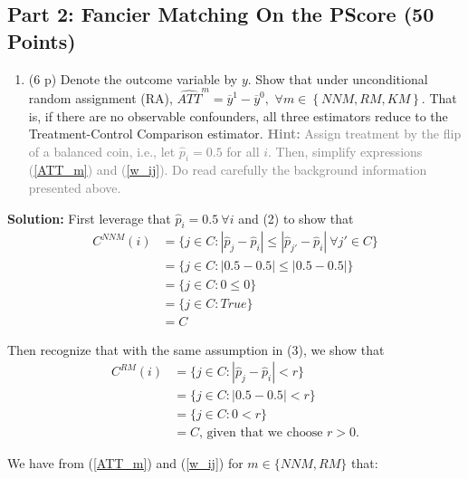 \documentclass[
]{article}
\providecommand{\tightlist}{%
  \setlength{\itemsep}{0pt}\setlength{\parskip}{0pt}}
\begin{document}
\subsection{Part 2: Fancier Matching On the PScore (50
Points)}\label{part-2-fancier-matching-on-the-pscore-50-points}


\newpage

\begin{enumerate}
\def\labelenumi{\arabic{enumi}.}
\setcounter{enumi}{3}
\tightlist
\item
  (6 p) Denote the outcome variable by \(y\). Show that under
  unconditional random assignment (RA),
  \(\widehat{ATT}^{m}=\overline{y}^{1}-\overline{y}^{0},\)
  \(\forall m\in \left\{ NNM,RM,KM\right\}\). That is, if there are no
  observable confounders, all three estimators reduce to the
  Treatment-Control Comparison estimator.
  \textcolor{gray}{\textbf{Hint:} Assign treatment by the flip of a balanced coin, i.e., let $\widehat{p}_{i}=0.5$ for all $i$. Then, simplify expressions (\ref{ATT_m}) and (\ref{w_ij}). Do read carefully the background information presented above.}
\end{enumerate}

\textbf{Solution:} First leverage that \(\hat{p}_i = 0.5 \ \forall i\)
and (2) to show that \begin{align*}
  C^{NNM}(i) &= \{j \in C : |\hat{p}_j - \hat{p}_i| \leq |\hat{p}_{j'} - \hat{p}_i| \ \forall j' \in C\}\\
  &= \{j \in C : |0.5 - 0.5| \leq |0.5 - 0.5| \}\\
  &= \{j \in C : 0 \leq 0 \}\\ 
  &= \{j \in C : True \}\\ 
  &= C 
\end{align*}

Then recognize that with the same assumption in (3), we show that
\begin{align*}
  C^{RM}(i) &= \{j \in C : |\hat{p}_j - \hat{p}_i| < r\}\\
  &= \{j \in C : |0.5 - 0.5| < r \}\\
  &= \{j \in C : 0 < r \}\\ 
  &= C \text{, given that we choose $r > 0$}. 
\end{align*}

We have from (\ref{ATT_m}) and (\ref{w_ij}) for \(m \in \{NNM, RM\}\)
that:
\end{document}
